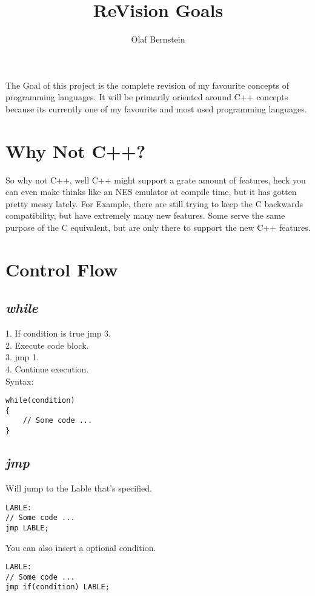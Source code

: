 \documentclass[11pt,a4paper]{article}
\author{Olaf Bernstein}
\title{ReVision Goals}
\begin{document}
\maketitle
The Goal of this project is the complete revision of my favourite concepts of programming languages. It will be primarily oriented around C++ concepts because its currently one of my favourite and most used programming languages.
\tableofcontents




\section{Why Not C++?}
So why not C++, well C++ might support a grate amount of features, heck you can even make thinks like an NES emulator at compile time, but it has gotten pretty messy lately. For Example, there are still trying to keep the C backwards compatibility, but have extremely many new features. Some serve the same purpose of the C equivalent, but are only there to support the new C++ features.




\section{Control Flow}


\subsection{\textit{while}}
1. If condition is true jmp 3. \\
2. Execute code block. \\
3. jmp 1. \\
4. Continue execution. \\
Syntax:
\begin{lstlisting}
while(condition)
{
	// Some code ...
}
\end{lstlisting}


\subsection{\textit{jmp}}
Will jump to the Lable that's specified.
\begin{lstlisting}
LABLE:
// Some code ...
jmp LABLE;
\end{lstlisting}
You can also insert a optional condition.
\begin{lstlisting}
LABLE:
// Some code ...
jmp if(condition) LABLE;
\end{lstlisting}
\end{document}
